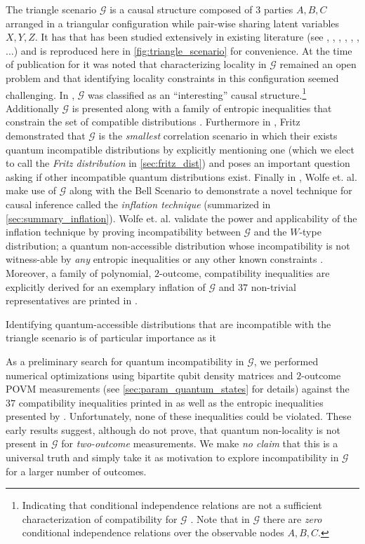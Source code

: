 \documentclass[aps, 10pt, english, twoside, pra, nofootinbib, longbibliography]{revtex4-1}
\theoremstyle{plain}
\theoremstyle{definition}
\theoremstyle{remark}
\newcommand{\graph}{\mathcal{G}}
\newcommand{\ts}{{\graph}}
\begin{document}
    The triangle scenario $\ts$ is a causal structure composed of $3$ parties $A, B, C$ arranged in a triangular configuration while pair-wise sharing latent variables $X, Y, Z$. It has that has been studied extensively in existing literature (see \cite[Fig. 1]{Steudel_2010}, \cite[Fig. 6]{Chaves_2014}, \cite[Fig. 8]{Branciard_2012}, \cite[Fig. 8, Appendix E]{Henson_2014}, \cite[Fig. 3]{Fritz_2012}, \cite[Fig. 1]{Inflation}, $\ldots$) and is reproduced here in \cref{fig:triangle_scenario} for convenience. At the time of publication for \cite{Branciard_2012} it was noted that characterizing locality in $\ts$ remained an open problem and that identifying locality constraints in this configuration seemed challenging. In \cite{Henson_2014}, $\ts$ was classified as an ``interesting'' causal structure.\footnote{Indicating that conditional independence relations are not a sufficient characterization of compatibility for $\ts$ \cite{Henson_2014}. Note that in $\ts$ there are \textit{zero} conditional independence relations over the observable nodes $A, B, C$.} Additionally $\ts$ is presented along with a family of entropic inequalities that constrain the set of compatible distributions \cite{Henson_2014}. Furthermore in \cite{Fritz_2012}, Fritz demonstrated that $\ts$ is the \textit{smallest} correlation scenario in which their exists quantum incompatible distributions by explicitly mentioning one (which we elect to call the \textit{Fritz distribution} in \cref{sec:fritz_dist}) and poses an important question asking if other incompatible quantum distributions exist. Finally in \cite{Inflation}, Wolfe et. al. make use of $\ts$ along with the Bell Scenario to demonstrate a novel technique for causal inference called the \textit{inflation technique} (summarized in \cref{sec:summary_inflation}). Wolfe et. al. validate the power and applicability of the inflation technique by proving incompatibility between $\ts$ and the $W$-type distribution; a quantum non-accessible distribution whose incompatibility is not witness-able by \textit{any} entropic inequalities or any other known constraints \cite{Inflation}. Moreover, a family of polynomial, $2$-outcome, compatibility inequalities are explicitly derived for an exemplary inflation of $\ts$ and $37$ non-trivial representatives are printed in \cite{Inflation}.

    Identifying quantum-accessible distributions that are incompatible with the triangle scenario is of particular importance as it 

    As a preliminary search for quantum incompatibility in $\ts$, we performed numerical optimizations using bipartite qubit density matrices and $2$-outcome POVM measurements (see \cref{sec:param_quantum_states} for details) against the $37$ compatibility inequalities printed in \cite{Inflation} as well as the entropic inequalities presented by \cite{Henson_2014}. Unfortunately, none of these inequalities could be violated. These early results suggest, although do not prove, that quantum non-locality is not present in $\ts$ for \textit{two-outcome} measurements. We make \textit{no claim} that this is a universal truth and simply take it as motivation to explore incompatibility in $\ts$ for a larger number of outcomes.
\end{document}
